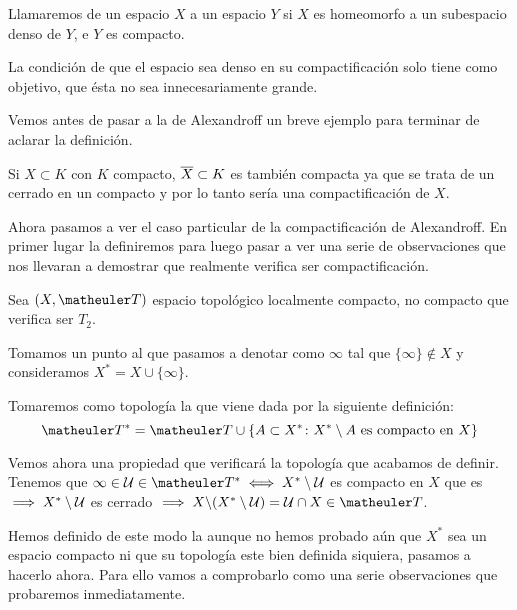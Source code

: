 \begin{defi}[Compactificación]
	Llamaremos  de un espacio $X$ a un espacio $Y$ si $X$ es homeomorfo a un subespacio denso de $Y$, e $Y$ es compacto.
\end{defi}


La condición de que el espacio sea denso en su compactificación solo tiene como objetivo, que ésta no sea innecesariamente grande. 


Vemos antes de pasar a la de Alexandroff un breve ejemplo para terminar de aclarar la definición.
\begin{exa}
	Si $X\subset K$ con $K$ compacto, $\overline{X}\subset K$ es también compacta ya que se trata de un cerrado en un compacto y por lo tanto sería una compactificación de $X$.
\end{exa}

Ahora pasamos a ver el caso particular de la compactificación de Alexandroff. En primer lugar la definiremos para luego pasar a ver una serie de observaciones que nos llevaran a demostrar que realmente verifica ser compactificación.
\begin{defi}
	Sea $(X,\T)$ espacio topológico localmente compacto, no compacto que verifica ser $T_2$.
	
	Tomamos un punto al que pasamos a denotar como $\infty$ tal que  $\{\infty\}\notin X$ y consideramos $X^*=X\cup\{\infty\}$. 
	
	Tomaremos como  topología la que viene dada por la siguiente definición:
	\begin{equation}
	\T ^* = \T \cup \{A \subset X^* \colon X^*\setminus A \textup{ es compacto en }X\}
	\end{equation}
	
	Vemos ahora una propiedad que verificará la topología que acabamos de definir. Tenemos que  $\infty\in\U\in\T^* \sii X^*\setminus\U$ es compacto en $X$ que es \hausdorff $\implies X^*\setminus\mathcal{U}$ es cerrado $\ra X\backslash(X^*\setminus\U)=\U\cap X\in\T$.
\end{defi}
Hemos definido de este modo la  aunque no hemos probado aún que $X^*$ sea un espacio compacto ni que su topología este bien definida siquiera, pasamos a hacerlo ahora. Para ello vamos a comprobarlo como una serie observaciones que probaremos inmediatamente.

